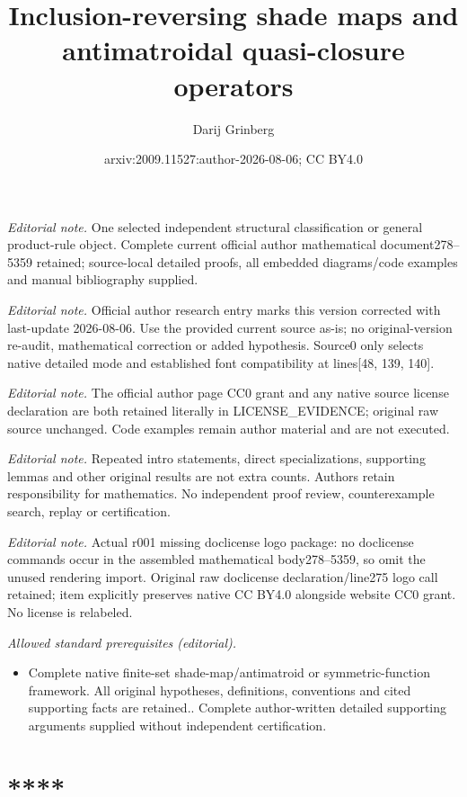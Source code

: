 \documentclass[numbers=enddot,12pt,final,onecolumn]{scrartcl}%
\title{Inclusion-reversing shade maps and antimatroidal quasi-closure operators}
\author{Darij Grinberg}
\date{arxiv:2009.11527:author-2026-08-06; CC BY4.0}
\theoremstyle{definition}
\begin{document}
\maketitle
\noindent\textit{Editorial note.} One selected independent structural classification or general product-rule object. Complete current official author mathematical document278--5359 retained; source-local detailed proofs, all embedded diagrams/code examples and manual bibliography supplied.\par\medskip
\noindent\textit{Editorial note.} Official author research entry marks this version corrected with last-update 2026-08-06. Use the provided current source as-is; no original-version re-audit, mathematical correction or added hypothesis. Source0 only selects native detailed mode and established font compatibility at lines[48, 139, 140].\par\medskip
\noindent\textit{Editorial note.} The official author page CC0 grant and any native source license declaration are both retained literally in LICENSE\_EVIDENCE; original raw source unchanged. Code examples remain author material and are not executed.\par\medskip
\noindent\textit{Editorial note.} Repeated intro statements, direct specializations, supporting lemmas and other original results are not extra counts. Authors retain responsibility for mathematics. No independent proof review, counterexample search, replay or certification.\par\medskip
\noindent\textit{Editorial note.} Actual r001 missing doclicense logo package: no doclicense commands occur in the assembled mathematical body278--5359, so omit the unused rendering import. Original raw doclicense declaration/line275 logo call retained; item explicitly preserves native CC BY4.0 alongside website CC0 grant. No license is relabeled.\par\medskip
\noindent\textit{Allowed standard prerequisites (editorial).}\begin{itemize}
\item Complete native finite-set shade-map/antimatroid or symmetric-function framework. All original hypotheses, definitions, conventions and cited supporting facts are retained.. Complete author-written detailed supporting arguments supplied without independent certification.
\end{itemize}\medskip
\section*{****}
\end{document}
